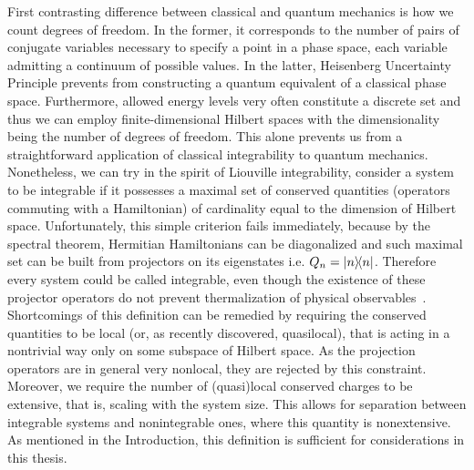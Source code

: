 First contrasting difference between classical and quantum mechanics is how we count
degrees of freedom. In the former, it corresponds to the number of pairs of conjugate variables
necessary to specify a point in a phase space, each variable admitting a continuum of 
possible values. In the latter, Heisenberg Uncertainty Principle prevents from 
constructing a quantum equivalent of a classical phase space. Furthermore, allowed energy
levels very often constitute a discrete set and thus we can employ finite-dimensional
Hilbert spaces with the dimensionality being the number of degrees of freedom.
This alone prevents us from a straightforward application of classical integrability to quantum
mechanics. Nonetheless, we can try in the spirit of Liouville integrability, consider
a system to be integrable if it possesses a maximal set of conserved quantities 
(operators commuting with a Hamiltonian) of cardinality
equal to the dimension of Hilbert space. Unfortunately, this simple criterion fails immediately,
because by the spectral theorem, Hermitian Hamiltonians can be diagonalized and such
maximal set can be built from projectors on its eigenstates i.e. \(Q_{n} = \ketbra{n}{n}\).
Therefore every system could be called integrable, even though the existence of these projector
operators do not prevent thermalization of physical observables~\autocite{DAlessio2016}.
Shortcomings of this definition can be remedied by requiring the conserved quantities
to be local (or, as recently discovered, quasilocal), that is acting in a nontrivial way
only on some subspace of Hilbert space. As the projection operators are in general very nonlocal,
they are rejected by this constraint. Moreover, we require the number of (quasi)local conserved
charges to be extensive, that is, scaling with the system size. This allows for 
separation between integrable systems and nonintegrable ones, where this quantity is nonextensive.
As mentioned in the Introduction, this definition is sufficient for considerations in this
thesis.

